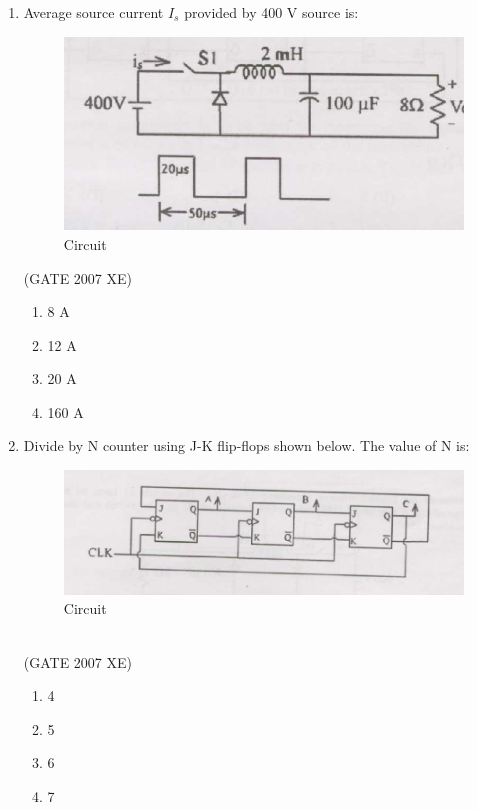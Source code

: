 \documentclass[journal,cmex10]{IEEEtran}
\theoremstyle{remark}
\numberwithin{equation}{enumi}
\numberwithin{figure}{enumi}
\begin{document}
\begin{enumerate}
    \item Average source current $I_s$ provided by 400 V source is:
    \begin{figure}[htbp]
  \centering
  \includegraphics[width=0.6\columnwidth]{figs/C/fig13.png}
  \caption{Circuit}
  \label{fig:C/fig13.png}
\end{figure}
    \bigskip
    \hfill{(GATE 2007 XE)}
    \begin{multicols}{4}
    \begin{enumerate}
        \item 8 A
        \item 12 A
        \item 20 A
        \item 160 A
    \end{enumerate}
    \end{multicols}

    \newpage
    
    \item Divide by N counter using J-K flip-flops shown below. The value of N is:
    \begin{figure}[htbp]
  \centering
  \includegraphics[width=0.9\columnwidth]{figs/C/fig14.png}
  \caption{Circuit}
  \label{C/fig14.png}
\end{figure}\\
    \hfill{(GATE 2007 XE)}
    \begin{multicols}{4}
    \begin{enumerate}
        \item 4
        \item 5
        \item 6
        \item 7
    \end{enumerate}
    \end{multicols}


\end{enumerate}
\end{document}
